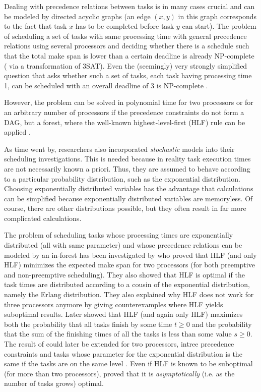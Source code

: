 Dealing with precedence relations between tasks is in many cases crucial and can be modeled by directed acyclic graphs (an edge $(x,y)$ in this graph corresponds to the fact that task $x$ has to be completed before task $y$ can start). The problem of scheduling a set of tasks with same processing time with general precedence relations using several processors and deciding whether there is a schedule such that the total make span is lower than a certain deadline is already NP-complete (\cite{Ullman:1975:NSP:1739944.1740138} via a transformation of 3SAT). Even the (seemingly) very strongly simplified question that asks whether such a set of tasks, each task having processing time 1, can be scheduled with an overall deadline of 3 is NP-complete \cite{lenstra-kan-1978}.

However, the problem can be solved in polynomial time for two processors \cite{coffman-graham-famous-two-proc-result} or for an arbitrary number of processors if the precedence constraints do not form a DAG, but a forest, where the well-known highest-level-first (HLF) rule can be applied \cite{hu:1961:hlfoptimalforknowntimesintree}. 

As time went by, researchers also incorporated \emph{stochastic} models into their scheduling investigations. This is needed because in reality task execution times are not necessarily known a priori. Thus, they are assumed to behave according to a particular probability distribution, such as the exponential distribution. Choosing exponentially distributed variables has the advantage that calculations can be simplified because exponentially distributed variables are memoryless. Of course, there are other distributions possible, but they often result in far more complicated calculations.

The problem of scheduling tasks whose processing times are exponentially distributed (all with same parameter) and whose precedence relations can be modeled by an in-forest has been investigated by \cite{chandyreynoldsshortpaper1975} who proved that HLF (and only HLF) minimizes the expected make span for two processors (for both preemptive and non-preemptive scheduling). They also showed that HLF is optimal if the task times are distributed according to a cousin of the exponential distribution, namely the Erlang distribution. They also explained why HLF does not work for three processors anymore by giving counterexamples where HLF yields suboptimal results. Later \cite{bruno-1985} showed that HLF (and again only HLF) maximizes both the probability that all tasks finish by some time $t\geq 0$ and the probability that the sum of the finishing times of all the tasks is less than some value $s\geq 0$. The result of \cite{chandyreynoldsshortpaper1975} could later be extended for two processors, intree precedence constraints and tasks whose parameter for the exponential distribution is the same if the tasks are on the same level \cite{pinedo-weiss}. Even if HLF is known to be suboptimal (for more than two processors), \cite{journals/siamcomp/PapadimitriouT87} proved that it is \emph{asymptotically} (i.e. as the number of tasks grows) optimal.

